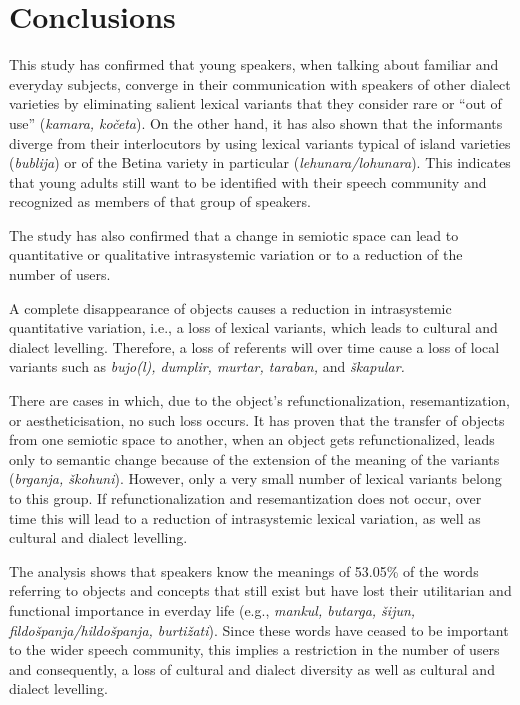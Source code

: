 \documentclass[output=paper]{LSP/langsci}
\begin{document}
\section{Conclusions}
This study has confirmed that young speakers, when talking about familiar and everyday subjects, converge in their communication with speakers of other dialect varieties by eliminating salient lexical variants that they consider rare or “out of use” (\textit{kamara, kočeta}). On the other hand, it has also shown that the informants diverge from their interlocutors by using lexical variants typical of island varieties (\textit{bublija}) or\textit{ }of the Betina variety in particular (\textit{lehunara/lohunara}). This indicates that young adults still want to be identified with their speech community and recognized as members of that group of speakers. 

The study has also confirmed that a change in semiotic space can lead to quantitative or qualitative intrasystemic variation or to a reduction of the number of users. 

A complete disappearance of objects causes a reduction in intrasystemic quantitative variation, i.e., a loss of lexical variants, which leads to cultural and dialect levelling. Therefore, a loss of referents will over time cause a loss of local variants such as \textit{bujo(l), dumplir, murtar, taraban, }and \textit{škapular. }

There are cases in which, due to the object’s refunctionalization, resemantization, or aestheticisation, no such loss occurs. It has proven that the transfer of objects from one semiotic space to another, when an object gets refunctionalized, leads only to semantic change because of the extension of the meaning of the variants (\textit{brganja, škohuni}). However, only a very small number of lexical variants belong to this group. If refunctionalization and resemantization does not occur, over time this will lead to a reduction of intrasystemic lexical variation, as well as cultural and dialect levelling. 

The analysis shows that speakers know the meanings of 53.05\% of the words referring to objects and concepts that still exist but have lost their utilitarian and functional importance in everday life (e.g., \textit{mankul, butarga, šijun, fildošpanja/hildošpanja, burtižati}). Since these words have ceased to be important to the wider speech community, this implies a restriction in the number of users and consequently, a loss of cultural and dialect diversity as well as cultural and dialect levelling.
\end{document}
